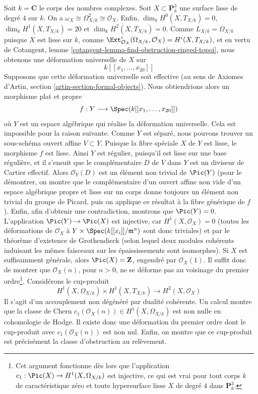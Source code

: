 \medskip\noindent
Soit $k = \mathbf{C}$ le corps des nombres complexes.
Soit $X \subset \mathbf{P}^3_k$ une surface lisse de degré $4$
sur $k$. On a
$\omega_X \cong \Omega^2_{X/k} \cong \mathcal{O}_X$.
Enfin,
$\dim_k H^0(X, T_{X/k}) = 0$,
$\dim_k H^1(X, T_{X/k}) = 20$ et
$\dim_k H^2(X, T_{X/k}) = 0$.
Comme $L_{X/k} = \Omega_{X/k}$ puisque $X$ est lisse sur $k$,
comme $\Ext^i_{\mathcal{O}_X}(\Omega_{X/k}, \mathcal{O}_X) =
H^i(X, T_{X/k})$, et en vertu de Cotangent, lemme
\ref{cotangent-lemma-find-obstruction-ringed-topoi},
nous obtenons une déformation universelle de $X$
sur
$$
k[[x_1, \ldots, x_{20}]]
$$
Supposons que cette déformation universelle soit effective
(au sens de Axiomes d'Artin, section \ref{artin-section-formal-objects}).
Nous obtiendrions alors un morphisme plat et propre
$$
f : Y \longrightarrow \Spec(k[[x_1, \ldots, x_{20}]])
$$
où $Y$ est un espace algébrique qui réalise la déformation universelle.
Cela est impossible pour la raison suivante. Comme $Y$ est séparé,
nous pouvons trouver un sous-schéma ouvert affine $V \subset Y$. Puisque la
fibre spéciale $X$ de $Y$ est lisse, le morphisme $f$ est lisse. Ainsi $Y$
est régulier, puisqu'il est lisse sur une base régulière, et il s'ensuit
que le complémentaire $D$ de $V$ dans $Y$ est un diviseur de Cartier effectif.
Alors $\mathcal{O}_Y(D)$ est un élément non trivial de $\Pic(Y)$
(pour le démontrer, on montre que le complémentaire d'un ouvert affine non vide
d'un espace algébrique propre et lisse sur un corps donne toujours un élément
non trivial du groupe de Picard, puis on applique ce résultat à la fibre générique
de $f$). Enfin, afin d'obtenir une contradiction, montrons que $\Pic(Y) = 0$.
L'application $\Pic(Y) \to \Pic(X)$ est injective,
car $H^1(X, \mathcal{O}_X) = 0$ (toutes les déformations de
$\mathcal{O}_X$ à $Y \times \Spec(k[[x_i]]/\mathfrak m^n)$
sont donc triviales) et par le théorème d'existence de Grothendieck
(selon lequel deux modules cohérents induisant les mêmes faisceaux
sur les épaississements
sont isomorphes). Si $X$ est suffisamment générale, alors
$\Pic(X) = \mathbf{Z}$, engendré par $\mathcal{O}_X(1)$. Il suffit donc de montrer que
$\mathcal{O}_X(n)$, pour $n > 0$, ne se déforme pas au voisinage du
premier ordre\footnote{Cet argument fonctionne dès lors que l'application
$c_1 : \Pic(X) \to H^1(X, \Omega_{X/k})$ est injective, ce qui est vrai
pour tout corps $k$ de caractéristique zéro et toute hypersurface lisse
$X$ de degré $4$ dans $\mathbf{P}^3_k$.}.
Considérons le cup-produit
$$
H^1(X, \Omega_{X/k}) \times H^1(X, T_{X/k})
\longrightarrow H^2(X, \mathcal{O}_X)
$$
Il s'agit d'un accouplement non dégénéré par dualité cohérente.
Un calcul montre que la classe de Chern
$c_1(\mathcal{O}_X(n)) \in H^1(X, \Omega_{X/k})$
est non nulle en cohomologie de Hodge.
Il existe donc une déformation du premier ordre
dont le cup-produit avec $c_1(\mathcal{O}_X(n))$ est non nul.
Enfin, on montre que ce cup-produit est précisément la classe
d'obstruction au relèvement.

